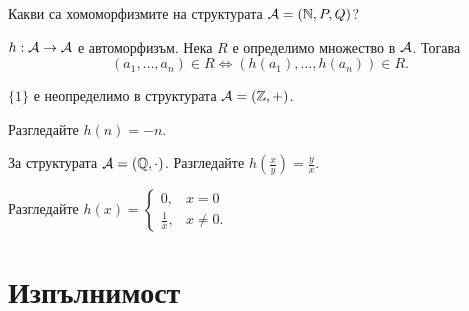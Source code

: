 Какви са хомоморфизмите на структурата $\mathcal{A} = (\mathbb{N}, P, Q)$?

\begin{theorem}
  $h:\mathcal{A}\to\mathcal{A}$ е автоморфизъм. Нека $R$ е определимо множество в $\mathcal{A}$. Тогава
  \[(a_1,\dots,a_n) \in R \iff (h(a_1),\dots,h(a_n)) \in R.\]
\end{theorem}


\begin{problem}
  $\{1\}$ е неопределимо в структурата $\mathcal{A} = (\mathbb{Z},+)$.
\end{problem}
Разгледайте $h(n) = -n$.


За структурата $\mathcal{A} = (\mathbb{Q}, \cdot)$.
Разгледайте $h(\frac{x}{y}) = \frac{y}{x}$.

Разгледайте
$h(x) =
\begin{cases}
  0, & x = 0\\
  \frac{1}{x}, & x \neq 0.
\end{cases}$



\section{Изпълнимост}



